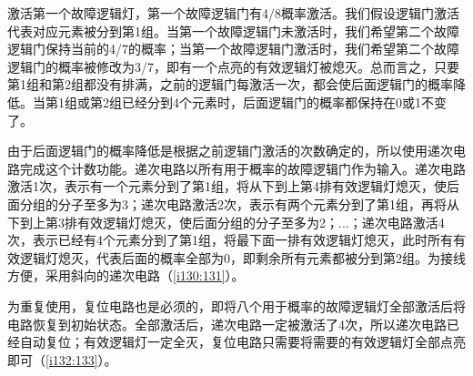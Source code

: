 激活第一个故障逻辑灯，第一个故障逻辑门有4/8概率激活。我们假设逻辑门激活代表对应元素被分到第1组。当第一个故障逻辑门未激活时，我们希望第二个故障逻辑门保持当前的4/7的概率；当第一个故障逻辑门激活时，我们希望第二个故障逻辑门的概率被修改为3/7，即有一个点亮的有效逻辑灯被熄灭。总而言之，只要第1组和第2组都没有排满，之前的逻辑门每激活一次，都会使后面逻辑门的概率降低。当第1组或第2组已经分到4个元素时，后面逻辑门的概率都保持在0或1不变了。

由于后面逻辑门的概率降低是根据之前逻辑门激活的次数确定的，所以使用递次电路完成这个计数功能。递次电路以所有用于概率的故障逻辑门作为输入。递次电路激活1次，表示有一个元素分到了第1组，将从下到上第4排有效逻辑灯熄灭，使后面分组的分子至多为3；递次电路激活2次，表示有两个元素分到了第1组，再将从下到上第3排有效逻辑灯熄灭，使后面分组的分子至多为2；...；递次电路激活4次，表示已经有4个元素分到了第1组，将最下面一排有效逻辑灯熄灭，此时所有有效逻辑灯熄灭，代表后面的概率全部为0，即剩余所有元素都被分到第2组。为接线方便，采用斜向的递次电路（\autoref{i130:131}）。

\begin{figure}[!ht]
\begin{center}
\qquad
{}
\end{center}
\caption{}
\label{i130:131}
\end{figure}

为重复使用，复位电路也是必须的，即将八个用于概率的故障逻辑灯全部激活后将电路恢复到初始状态。全部激活后，递次电路一定被激活了4次，所以递次电路已经自动复位；有效逻辑灯一定全灭，复位电路只需要将需要的有效逻辑灯全部点亮即可（\autoref{i132:133}）。

